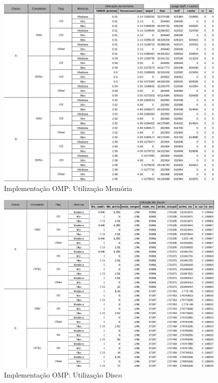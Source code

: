 \documentclass{article}
\begin{document}
\begin{appendices}
\begin{figure}[H]
    \centering
    \includegraphics[width=12cm]{Pictures/FT_r641_OMP_MEM.png}
    \caption{Implementação OMP: Utilização Memória}
    \label{figure:FT_r641_OMP_MEM}
\end{figure}

\begin{figure}[H]
    \centering
    \includegraphics[width=12cm]{Pictures/FT_r641_OMP_DISK.png}
    \caption{Implementação OMP: Utilização Disco}
    \label{figure:FT_r641_OMP_DISK}
\end{figure}


\end{appendices}
\end{document}
